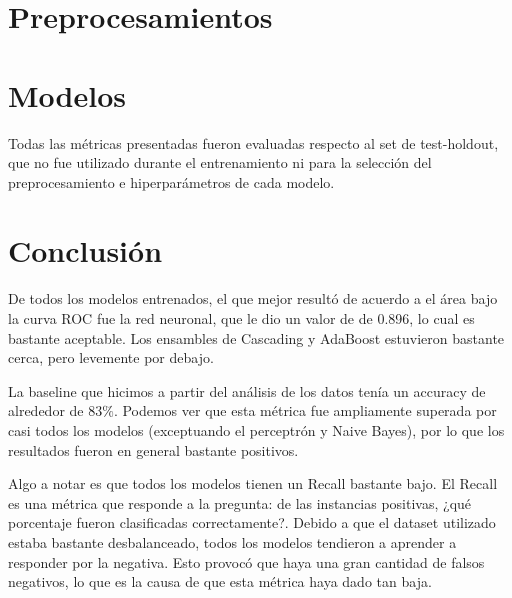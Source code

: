 \documentclass[12pt]{article}
\numberwithin{equation}{section}
\numberwithin{figure}{section}
\numberwithin{table}{section}
\begin{document}
	\tableofcontents
	\newpage
	
	
	\section{Preprocesamientos}
	
	\begingroup
	\fontsize{11pt}{12pt}\selectfont
	
	
	\endgroup

	\pagebreak

	\section{Modelos}
	Todas las métricas presentadas fueron evaluadas respecto al set de
	test-holdout, que no fue utilizado durante el entrenamiento ni
	para la selección del preprocesamiento e hiperparámetros de cada modelo.

	\begingroup
	\fontsize{11pt}{12pt}\selectfont
	
	
	\endgroup
	
	
	\restoregeometry
	
	\pagebreak

	\section{Conclusión}
	De todos los modelos entrenados, el que mejor resultó de acuerdo a
	el área bajo la curva ROC fue la red neuronal, que le dio un valor de
	de 0.896, lo cual es bastante aceptable. Los ensambles de Cascading
	y AdaBoost estuvieron bastante cerca, pero levemente por debajo.

	La baseline que hicimos a partir del análisis de los datos tenía un
	accuracy de alrededor de $83\%$. Podemos ver que esta métrica fue
	ampliamente superada por casi todos los modelos (exceptuando el
	perceptrón y Naive Bayes), por lo que los resultados fueron en general
	bastante positivos.

	Algo a notar es que todos los modelos tienen un Recall bastante bajo.
	El Recall es una métrica que responde a la pregunta: de las instancias
	positivas, ¿qué porcentaje fueron clasificadas correctamente?. Debido
	a que el dataset utilizado estaba bastante desbalanceado, todos los modelos
	tendieron a aprender a responder por la negativa. Esto provocó que haya
	una gran cantidad de falsos negativos, lo que es la causa de que esta métrica
	haya dado tan baja.
\end{document}
